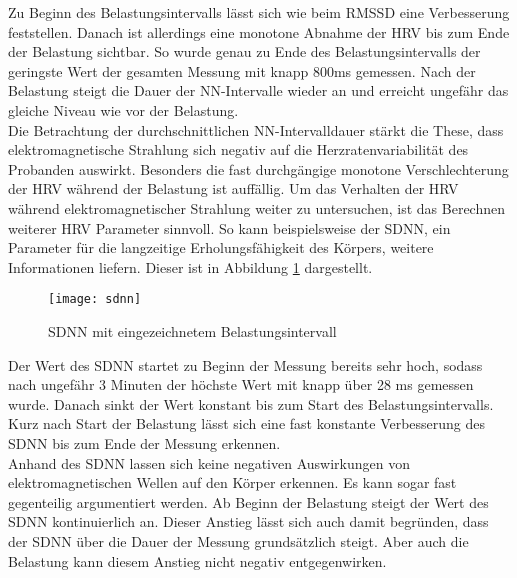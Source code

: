 Zu Beginn des Belastungsintervalls lässt sich wie beim RMSSD eine Verbesserung feststellen. Danach ist allerdings eine monotone Abnahme der HRV bis zum Ende der Belastung sichtbar. So wurde genau zu Ende des Belastungsintervalls der geringste Wert der gesamten Messung mit knapp 800ms gemessen. Nach der Belastung steigt die Dauer der NN-Intervalle wieder an und erreicht ungefähr das gleiche Niveau wie vor der Belastung. \\
Die Betrachtung der durchschnittlichen NN-Intervalldauer stärkt die These, dass elektromagnetische Strahlung sich negativ auf die Herzratenvariabilität des Probanden auswirkt. Besonders die fast durchgängige monotone Verschlechterung der HRV während der Belastung ist auffällig. Um das Verhalten der HRV während elektromagnetischer Strahlung weiter zu untersuchen, ist das Berechnen weiterer HRV Parameter sinnvoll. So kann beispielsweise der SDNN, ein Parameter für die langzeitige Erholungsfähigkeit des Körpers, weitere Informationen liefern. Dieser ist in Abbildung \ref{fig:sdnn} dargestellt.
\begin{figure}[H]
	\centering
	\texttt{[image: sdnn]}
	\caption{SDNN mit eingezeichnetem Belastungsintervall}
	\label{fig:sdnn}
\end{figure}

Der Wert des SDNN startet zu Beginn der Messung bereits sehr hoch, sodass nach ungefähr 3 Minuten der höchste Wert mit knapp über 28 ms gemessen wurde. Danach sinkt der Wert konstant bis zum Start des Belastungsintervalls. Kurz nach Start der Belastung lässt sich eine fast konstante Verbesserung des SDNN bis zum Ende der Messung erkennen. \\
Anhand des SDNN lassen sich keine negativen Auswirkungen von elektromagnetischen Wellen auf den Körper erkennen. Es kann sogar fast gegenteilig argumentiert werden. Ab Beginn der Belastung steigt der Wert des SDNN kontinuierlich an. Dieser Anstieg lässt sich auch damit begründen, dass der SDNN über die Dauer der Messung grundsätzlich steigt. Aber auch die Belastung kann diesem Anstieg nicht negativ entgegenwirken.  

